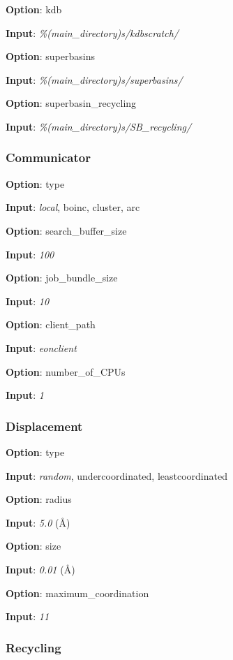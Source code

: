 \documentclass{article}
\begin{document}
\noindent\textbf{Option}:  kdb

\noindent\textbf{Input}:  \emph{\%(main\_directory)s/kdbscratch/}

\noindent\textbf{Option}:  superbasins

\noindent\textbf{Input}:  \emph{\%(main\_directory)s/superbasins/}

\noindent\textbf{Option}:  superbasin\_recycling

\noindent\textbf{Input}:  \emph{\%(main\_directory)s/SB\_recycling/}

\subsubsection{Communicator}

\noindent\textbf{Option}:  type

\noindent\textbf{Input}:  \emph{local}, boinc, cluster, arc

\noindent\textbf{Option}:  search\_buffer\_size

\noindent\textbf{Input}:  \emph{100}

\noindent\textbf{Option}:  job\_bundle\_size

\noindent\textbf{Input}:  \emph{10}

\noindent\textbf{Option}:  client\_path

\noindent\textbf{Input}:  \emph{eonclient}

\noindent\textbf{Option}:  number\_of\_CPUs

\noindent\textbf{Input}:  \emph{1}

\subsubsection{Displacement}

\noindent\textbf{Option}:  type

\noindent\textbf{Input}:  \emph{random}, undercoordinated, leastcoordinated

\noindent\textbf{Option}:  radius

\noindent\textbf{Input}:  \emph{5.0} (\AA)

\noindent\textbf{Option}:  size

\noindent\textbf{Input}:  \emph{0.01} (\AA)

\noindent\textbf{Option}:  maximum\_coordination

\noindent\textbf{Input}:  \emph{11}

\subsubsection{Recycling}
\end{document}
